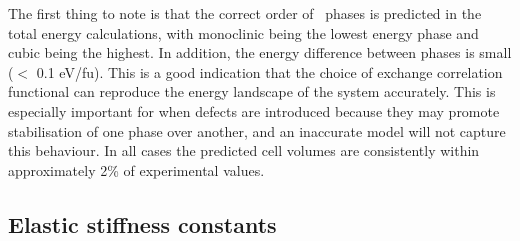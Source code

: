 \begin{table}[ht] %
\onehalfspacing
\centering
\caption[Calculated unit cell parameters for the different crystal structures of \zirconia . Experimental data for pure monoclinic, yttria-stabilised tetragonal and magnesia-stabilised cubic phases at 295 K are shown in parentheses. Energy difference between structures is shown with respect to the cubic phase.]{Calculated unit cell parameters for the different crystal structures of \zirconia . Experimental data for monoclinic, tetragonal and cubic phases at 295 K are shown in parentheses \cite{Howard1988}. Energy difference between structures is shown with respect to the cubic phase.}
\label{lattice_params}
\end{table}

The first thing to note is that the correct order of \zirconia\ phases is predicted in the total energy calculations, with monoclinic being the lowest energy phase and cubic being the highest. In addition, the energy difference between phases is small ($<$ 0.1 eV/fu). This is a good indication that the choice of exchange correlation functional can reproduce the energy landscape of the system accurately. This is especially important for when defects are introduced because they may promote stabilisation of one phase over another, and an inaccurate model will not capture this behaviour. In all cases the predicted cell volumes are consistently within approximately 2\% of experimental values. 

\subsection{Elastic stiffness constants} \label{bulk_moduli}

